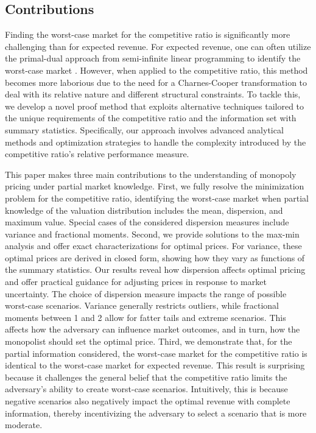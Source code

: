 \documentclass[11pt]{article}
\newcommand{\1}{\mathds{1}}
\begin{document}
\subsection{Contributions}
Finding the worst-case market for the competitive ratio is significantly more challenging than for expected revenue. For expected revenue, one can often utilize the primal-dual approach from semi-infinite linear programming to identify the worst-case market \citep{chen2022distribution,roos2019chebyshev}. However, when applied to the competitive ratio, this method becomes more laborious due to the need for a Charnes-Cooper transformation to deal with its relative nature and different structural constraints. To tackle this, we develop a novel proof method that exploits alternative techniques tailored to the unique requirements of the competitive ratio and the information set with summary statistics. Specifically, our approach involves advanced analytical methods and optimization strategies to handle the complexity introduced by the competitive ratio's relative performance measure. 

This paper makes three main contributions to the understanding of monopoly pricing under partial market knowledge. First, we fully resolve the minimization problem for the competitive ratio, identifying the worst-case market when partial knowledge of the valuation distribution includes the mean, dispersion, and maximum value. Special cases of the considered dispersion measures include variance and fractional moments. Second, we provide solutions to the max-min analysis and offer exact characterizations for optimal prices. For variance, these optimal prices are derived in closed form, showing how they vary as functions of the summary statistics. Our results reveal how dispersion affects optimal pricing and offer practical guidance for adjusting prices in response to market uncertainty. The choice of dispersion measure impacts the range of possible worst-case scenarios. Variance generally restricts outliers, while fractional moments between 1 and 2 allow for fatter tails and extreme scenarios. This affects how the adversary can influence market outcomes, and in turn, how the monopolist should set the optimal price.  
Third, we demonstrate that, for the partial information considered, the worst-case market for the competitive ratio is identical to the worst-case market for expected revenue. This result is surprising because it challenges the general belief that the competitive ratio limits the adversary's ability to create worst-case scenarios. Intuitively, this is because negative scenarios also negatively impact the optimal revenue with complete information, thereby incentivizing the adversary to select a scenario that is more moderate.
\end{document}
